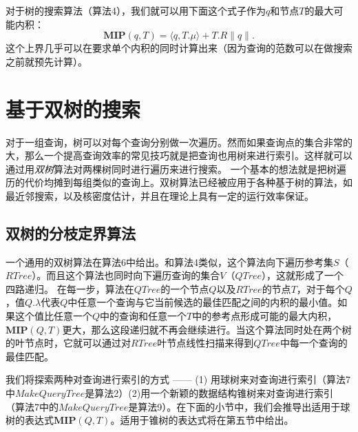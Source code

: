 \documentclass[twocolumn]{article}
\begin{document}
对于树的搜索算法（算法4），我们就可以用下面这个式子作为$q$和节点$T$的最大可能内积：
\begin{equation*}
\mathbf{MIP}(q,T) = \langle q,T.\mu\rangle + T.R\|q\|.
\end{equation*}
这个上界几乎可以在要求单个内积的同时计算出来（因为查询的范数可以在做搜索之前就预先计算）。

\section{基于双树的搜索}
对于一组查询，树可以对每个查询分别做一次遍历。然而如果查询点的集合非常的大，那么一个提高查询效率的常见技巧就是把查询也用树来进行索引。这样就可以通过用\emph{双树}算法\cite{15}对两棵树同时进行遍历来进行搜索。
一个基本的想法就是把树遍历的代价均摊到每组类似的查询上。双树算法已经被应用于各种基于树的算法，如最近邻搜索\cite{15}，以及核密度估计\cite{16}，并且在理论上具有一定的运行效率保证\cite{31}。

\subsection{双树的分枝定界算法}
一个通用的双树算法在算法6中给出。和算法4类似，这个算法向下遍历参考集$S$（$RTree$）。而且这个算法也同时向下遍历查询的集合$V$（$QTree$），这就形成了一个四路递归。
在每一步，算法在$QTree$的一个节点$Q$以及$RTree$的节点$T$，对于每个$Q$，值$Q.\lambda$代表$Q$中任意一个查询与它当前候选的最佳匹配之间的内积的最小值。如果这个值比任意一个$Q$中的查询和任意一个$T$中的参考点形成可能的最大内积，$\mathbf{MIP}(Q,T)$更大，那么这段递归就不再会继续进行。当这个算法同时处在两个树的叶节点时，它就可以通过对$RTree$叶节点线性扫描来得到$QTree$中每一个查询的最佳匹配。

我们将探索两种对查询进行索引的方式 ------ (1) 用球树来对查询进行索引（算法7中$MakeQueryTree$是算法2）(2)用一个新颖的数据结构锥树来对查询进行索引（算法7中的$MakeQueryTree$是算法9）。在下面的小节中，我们会推导出适用于球树的表达式$\mathbf{MIP}(Q,T)$。适用于锥树的表达式将在第五节中给出。
\end{document}

